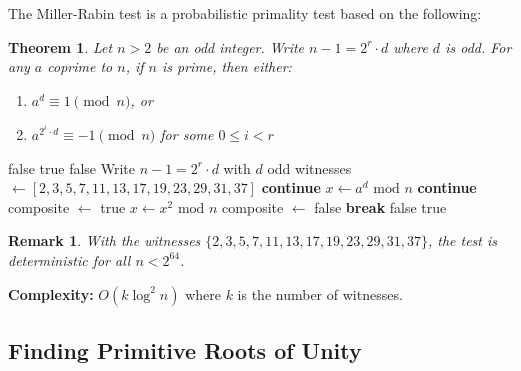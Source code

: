 \documentclass[11pt,a4paper]{article}
\newtheorem{theorem}{Theorem}
\newtheorem{remark}{Remark}
\newcommand{\bmod}{\text{ mod }}
\begin{document}
The Miller-Rabin test is a probabilistic primality test based on the following:

\begin{theorem}
Let $n > 2$ be an odd integer. Write $n - 1 = 2^r \cdot d$ where $d$ is odd. For any $a$ coprime to $n$, if $n$ is prime, then either:
\begin{enumerate}
    \item $a^d \equiv 1 \pmod{n}$, or
    \item $a^{2^i \cdot d} \equiv -1 \pmod{n}$ for some $0 \leq i < r$
\end{enumerate}
\end{theorem}

\begin{algorithm}[H]
\caption{Miller-Rabin Primality Test}
\begin{algorithmic}[1]
     \Return false \EndIf
     \Return true \EndIf
    \If{$n \bmod 2 = 0$} \Return false \EndIf
    \State Write $n - 1 = 2^r \cdot d$ with $d$ odd
    \State witnesses $\gets [2, 3, 5, 7, 11, 13, 17, 19, 23, 29, 31, 37]$
         \textbf{continue} \EndIf
        \State $x \gets a^d \bmod n$
         \textbf{continue} \EndIf
        \State composite $\gets$ true
            \State $x \gets x^2 \bmod n$
                \State composite $\gets$ false
                \State \textbf{break}
            \EndIf
        \EndFor
         \Return false \EndIf
    \EndFor
    \State \Return true
\EndFunction
\end{algorithmic}
\end{algorithm}

\begin{remark}
With the witnesses $\{2, 3, 5, 7, 11, 13, 17, 19, 23, 29, 31, 37\}$, the test is deterministic for all $n < 2^{64}$.
\end{remark}

\textbf{Complexity:} $O(k \log^2 n)$ where $k$ is the number of witnesses.

\subsection{Finding Primitive Roots of Unity}
\end{document}
